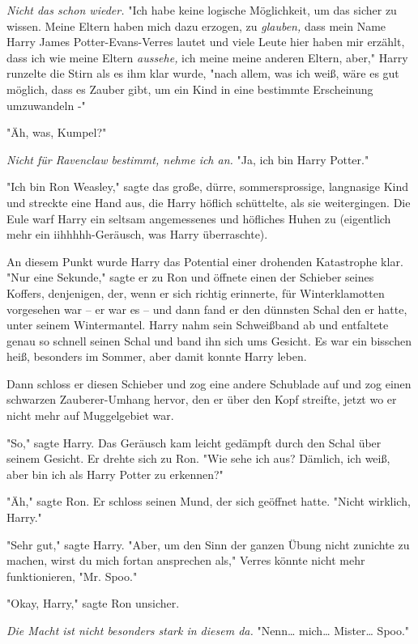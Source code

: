 {\emph{Nicht das schon wieder.} "Ich habe keine logische Möglichkeit, um das sicher zu wissen. Meine Eltern haben mich dazu erzogen, zu \emph{glauben,} dass mein Name Harry James Potter-Evans-Verres lautet und viele Leute hier haben mir erzählt, dass ich wie meine Eltern \emph{aussehe,} ich meine meine anderen Eltern, aber," Harry runzelte die Stirn als es ihm klar wurde, "nach allem, was ich weiß, wäre es gut möglich, dass es Zauber gibt, um ein Kind in eine bestimmte Erscheinung umzuwandeln -"

"Äh, was, Kumpel?"

\emph{Nicht für Ravenclaw bestimmt, nehme ich an.} "Ja, ich bin Harry Potter."

"Ich bin Ron Weasley," sagte das große, dürre, sommersprossige, langnasige Kind und streckte eine Hand aus, die Harry höflich schüttelte, als sie weitergingen. Die Eule warf Harry ein seltsam angemessenes und höfliches Huhen zu (eigentlich mehr ein iihhhhh-Geräusch, was Harry überraschte).

An diesem Punkt wurde Harry das Potential einer drohenden Katastrophe klar. "Nur eine Sekunde," sagte er zu Ron und öffnete einen der Schieber seines Koffers, denjenigen, der, wenn er sich richtig erinnerte, für Winterklamotten vorgesehen war -- er war es -- und dann fand er den dünnsten Schal den er hatte, unter seinem Wintermantel. Harry nahm sein Schweißband ab und entfaltete genau so schnell seinen Schal und band ihn sich ums Gesicht. Es war ein bisschen heiß, besonders im Sommer, aber damit konnte Harry leben.

Dann schloss er diesen Schieber und zog eine andere Schublade auf und zog einen schwarzen Zauberer-Umhang hervor, den er über den Kopf streifte, jetzt wo er nicht mehr auf Muggelgebiet war.

"So," sagte Harry. Das Geräusch kam leicht gedämpft durch den Schal über seinem Gesicht. Er drehte sich zu Ron. "Wie sehe ich aus? Dämlich, ich weiß, aber bin ich als Harry Potter zu erkennen?"

"Äh," sagte Ron. Er schloss seinen Mund, der sich geöffnet hatte. "Nicht wirklich, Harry."

"Sehr gut," sagte Harry. "Aber, um den Sinn der ganzen Übung nicht zunichte zu machen, wirst du mich fortan ansprechen als," Verres könnte nicht mehr funktionieren, "Mr. Spoo."

"Okay, Harry," sagte Ron unsicher.

\emph{Die Macht ist nicht besonders stark in diesem da.} "Nenn… mich… Mister… Spoo."

}
